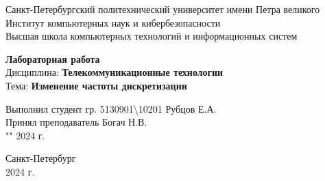 \begingroup
\fontsize{12pt}{14pt}\selectfont

\begin{center}

    Санкт-Петербургский политехнический университет имени Петра великого\\
    Институт компьютерных наук и кибербезопасности\\
    Высшая школа компьютерных технологий и информационных систем\\

    \vspace{\fill}

    \onehalfspacing
    \textbf{\huge Лабораторная работа }\\
    \medbreak
    Дисциплина:\textbf{ Телекоммуникационные технологии}\\
    Тема: \textbf{ Изменение частоты дискретизации}\\
    \vspace{1.5cm}
\end{center}


\begin{flushright}
    \doublespacing
    Выполнил студент гр. 5130901{\textbackslash}10201 \underline{\hspace{7em}} Рубцов Е.А.\\
    \smallskip
    Принял преподаватель \uline{\hspace{7em}}Богач Н.В. \\
    \smallskip
    "\uline{\hspace{1.5em}}" \uline{\hspace{5em}} 2024 г.\\
\end{flushright}

\vspace{\fill}

\begin{center}
    Санкт-Петербург\\
    2024 г.\\
\end{center}

\singlespacing

\pagebreak

\endgroup

